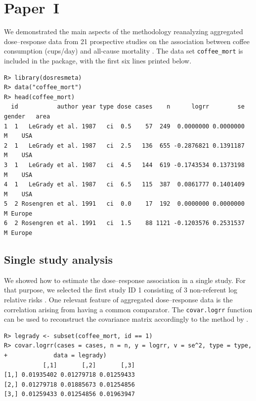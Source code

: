 \documentclass[11pt,a4paper,twoside,openany]{book}\usepackage{knitr}
\begin{document}
{{%
\section{Paper~I}\label{sec:res_paperI}

We demonstrated the main aspects of the methodology reanalyzing aggregated dose--response data from 21 prospective studies on the association between coffee consumption (cups/day) and all-cause mortality \citep{crippa2014coffee}. The data set \texttt{coffee\_mort} is included in the package, with the first six lines printed below.

\begin{knitrout}\footnotesize
{}\color{fgcolor}\begin{kframe}
\begin{verbatim}
R> library(dosresmeta)
R> data("coffee_mort")
R> head(coffee_mort)
  id           author year type dose cases    n      logrr        se gender   area
1  1   LeGrady et al. 1987   ci  0.5    57  249  0.0000000 0.0000000      M    USA
2  1   LeGrady et al. 1987   ci  2.5   136  655 -0.2876821 0.1391187      M    USA
3  1   LeGrady et al. 1987   ci  4.5   144  619 -0.1743534 0.1373198      M    USA
4  1   LeGrady et al. 1987   ci  6.5   115  387  0.0861777 0.1401409      M    USA
5  2 Rosengren et al. 1991   ci  0.0    17  192  0.0000000 0.0000000      M Europe
6  2 Rosengren et al. 1991   ci  1.5    88 1121 -0.1203576 0.2531537      M Europe
\end{verbatim}
\end{kframe}
\end{knitrout}

\subsection{Single study analysis}

\noindent We showed how to estimate the dose--response association in a single study. For that purpose, we selected the first study ID 1 consisting of 3 non-referent log relative risks \citep{legrady1987coffee}. One relevant feature of aggregated dose--response data is the correlation arising from having a common comparator. The \texttt{covar.logrr} function can be used to reconstruct the covariance matrix accordingly to the method by \cite{greenland1992methods}.

\begin{knitrout}\footnotesize
{}\color{fgcolor}\begin{kframe}
\begin{verbatim}
R> legrady <- subset(coffee_mort, id == 1)
R> covar.logrr(cases = cases, n = n, y = logrr, v = se^2, type = type, 
+             data = legrady)
           [,1]       [,2]       [,3]
[1,] 0.01935402 0.01279718 0.01259433
[2,] 0.01279718 0.01885673 0.01254856
[3,] 0.01259433 0.01254856 0.01963947
\end{verbatim}
\end{kframe}
\end{knitrout}

}}
\end{document}
